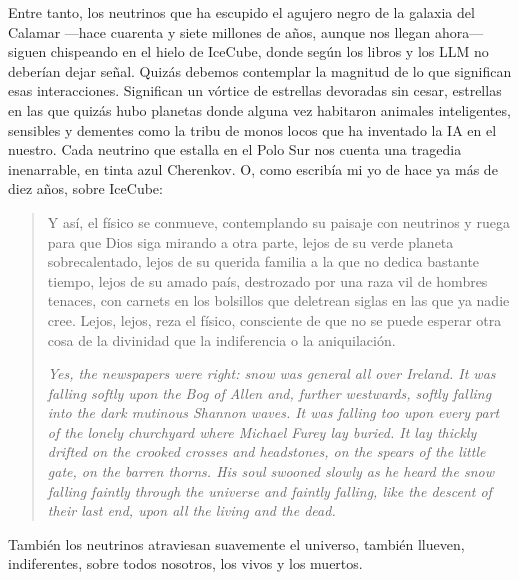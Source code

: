 \documentclass[11pt,a4paper]{article}
\begin{document}
Entre tanto, los neutrinos que ha escupido el agujero negro de la galaxia del Calamar ---hace cuarenta y siete millones de años, aunque nos llegan ahora--- siguen chispeando en el hielo de IceCube, donde según los libros y los LLM no deberían dejar señal. Quizás debemos contemplar la magnitud de lo que significan esas interacciones. Significan un vórtice de estrellas devoradas sin cesar, estrellas en las que quizás hubo planetas donde alguna vez habitaron animales inteligentes, sensibles y dementes como la tribu de monos locos que ha inventado la IA en el nuestro. Cada neutrino que estalla en el Polo Sur nos cuenta una tragedia inenarrable, en tinta azul Cherenkov. O, como escribía mi yo de hace ya más de diez años, sobre IceCube:

\begin{quotation}
Y así, el físico se conmueve, contemplando su paisaje con neutrinos y ruega para que Dios siga mirando a otra parte, lejos de su verde planeta sobrecalentado, lejos de su querida familia a la que no dedica bastante tiempo, lejos de su amado país, destrozado por una raza vil de hombres tenaces, con carnets en los bolsillos que deletrean siglas en las que ya nadie cree. Lejos, lejos, reza el físico, consciente de que no se puede esperar otra cosa de la divinidad que la indiferencia o la aniquilación.

{\itshape Yes, the newspapers were right: snow was general all over Ireland. It was falling softly upon the Bog of Allen and, further westwards, softly falling into the dark mutinous Shannon waves. It was falling too upon every part of the lonely churchyard where Michael Furey lay buried. It lay thickly drifted on the crooked crosses and headstones, on the spears of the little gate, on the barren thorns. His soul swooned slowly as he heard the snow falling faintly through the universe and faintly falling, like the descent of their last end, upon all the living and the dead.}
\end{quotation}

También los neutrinos atraviesan suavemente el universo, también llueven, indiferentes, sobre todos nosotros, los vivos y los muertos.
\end{document}
